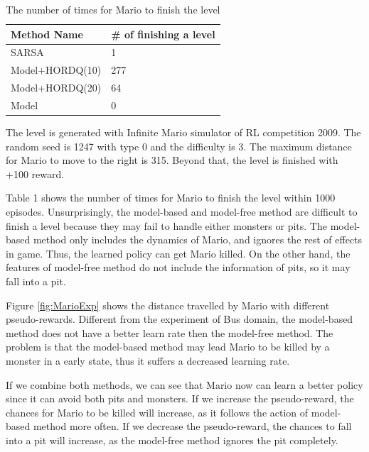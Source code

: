 \begin{table}
\begin{tabular}[h]{l|l}
\hline
Method Name & \# of finishing a level\\
\hline
SARSA    & 1\\
Model+HORDQ(10)    & 277\\
Model+HORDQ(20)     & 64\\
Model        & 0\\
\hline
\hline
\end{tabular}
\caption{The number of times for Mario to finish the level}
\end{table}


The level is generated with Infinite Mario simulator of RL competition 2009. The random seed is 1247
with type 0 and the difficulty is 3.
The maximum distance for Mario to move to the right is 315.
Beyond that, the level is finished with +100 reward.

Table 1 shows the number of times for Mario to finish the level within 1000 episodes.
Unsurprisingly, the model-based and model-free method are difficult
to finish a level because they may fail to handle either monsters or pits.
The model-based method only includes the dynamics of Mario, and ignores the rest of effects in game.
Thus, the learned policy can get Mario killed. On the other hand, the features of model-free method
do not include the information of pits, so it may fall into a pit.

Figure \ref{fig:MarioExp} shows the distance travelled by Mario with different pseudo-rewards.
Different from the experiment of Bus domain, the model-based method does not have
a better learn rate then the model-free method. The problem is that the model-based method
may lead Mario to be killed by a monster in a early state, thus it suffers a decreased learning rate.

If we combine both methods, we can see that Mario now can learn a better policy since
it can avoid both pits and monsters.
If we increase the pseudo-reward, the chances for Mario to be killed will increase, as it follows
the action of model-based method more often.
If we decrease the pseudo-reward, the chances to fall into a pit will increase, as the model-free  
method ignores the pit completely.


